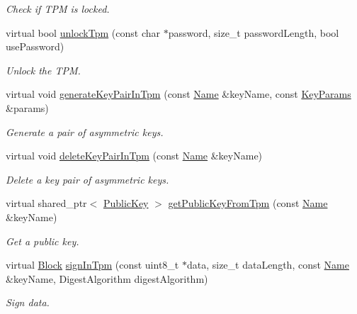 \begin{DoxyCompactItemize}
\begin{DoxyCompactList}\small\item\em Check if T\+PM is locked. \end{DoxyCompactList}\item 
virtual bool \hyperlink{classndn_1_1security_1_1DummyTpm_ac5b72cee5250ee8d527ee87c05da54fe}{unlock\+Tpm} (const char $\ast$password, size\+\_\+t password\+Length, bool use\+Password)
\begin{DoxyCompactList}\small\item\em Unlock the T\+PM. \end{DoxyCompactList}\item 
virtual void \hyperlink{classndn_1_1security_1_1DummyTpm_ac17889343c10d978331f061fcb31b3b3}{generate\+Key\+Pair\+In\+Tpm} (const \hyperlink{classndn_1_1Name}{Name} \&key\+Name, const \hyperlink{classndn_1_1KeyParams}{Key\+Params} \&params)
\begin{DoxyCompactList}\small\item\em Generate a pair of asymmetric keys. \end{DoxyCompactList}\item 
virtual void \hyperlink{classndn_1_1security_1_1DummyTpm_adab6ebf93ad80540fcad702a848f9b1e}{delete\+Key\+Pair\+In\+Tpm} (const \hyperlink{classndn_1_1Name}{Name} \&key\+Name)
\begin{DoxyCompactList}\small\item\em Delete a key pair of asymmetric keys. \end{DoxyCompactList}\item 
virtual shared\+\_\+ptr$<$ \hyperlink{classndn_1_1PublicKey}{Public\+Key} $>$ \hyperlink{classndn_1_1security_1_1DummyTpm_aa89e243be321fa3bce14f75b1d0678a2}{get\+Public\+Key\+From\+Tpm} (const \hyperlink{classndn_1_1Name}{Name} \&key\+Name)
\begin{DoxyCompactList}\small\item\em Get a public key. \end{DoxyCompactList}\item 
virtual \hyperlink{classndn_1_1Block}{Block} \hyperlink{classndn_1_1security_1_1DummyTpm_aee48006073007d33144bf78cd9a25b7a}{sign\+In\+Tpm} (const uint8\+\_\+t $\ast$data, size\+\_\+t data\+Length, const \hyperlink{classndn_1_1Name}{Name} \&key\+Name, Digest\+Algorithm digest\+Algorithm)
\begin{DoxyCompactList}\small\item\em Sign data. \end{DoxyCompactList}\item 

\end{DoxyCompactItemize}
